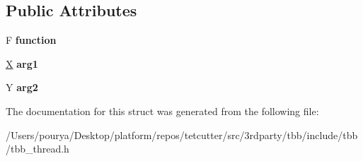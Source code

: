 \subsection*{Public Attributes}
\begin{DoxyCompactItemize}
\item 
\hypertarget{structtbb_1_1internal_1_1thread__closure__2_a247bf0a01f8a390031b71c9b85fb8b24}{}F {\bfseries function}\label{structtbb_1_1internal_1_1thread__closure__2_a247bf0a01f8a390031b71c9b85fb8b24}

\item 
\hypertarget{structtbb_1_1internal_1_1thread__closure__2_a36f694b6dcc91c92b09d3deee24e4732}{}\hyperlink{structX}{X} {\bfseries arg1}\label{structtbb_1_1internal_1_1thread__closure__2_a36f694b6dcc91c92b09d3deee24e4732}

\item 
\hypertarget{structtbb_1_1internal_1_1thread__closure__2_a47f0e53fc6b9026d9529a3bf1cc4fa72}{}Y {\bfseries arg2}\label{structtbb_1_1internal_1_1thread__closure__2_a47f0e53fc6b9026d9529a3bf1cc4fa72}

\end{DoxyCompactItemize}


The documentation for this struct was generated from the following file\+:\begin{DoxyCompactItemize}
\item 
/\+Users/pourya/\+Desktop/platform/repos/tetcutter/src/3rdparty/tbb/include/tbb/tbb\+\_\+thread.\+h\end{DoxyCompactItemize}
